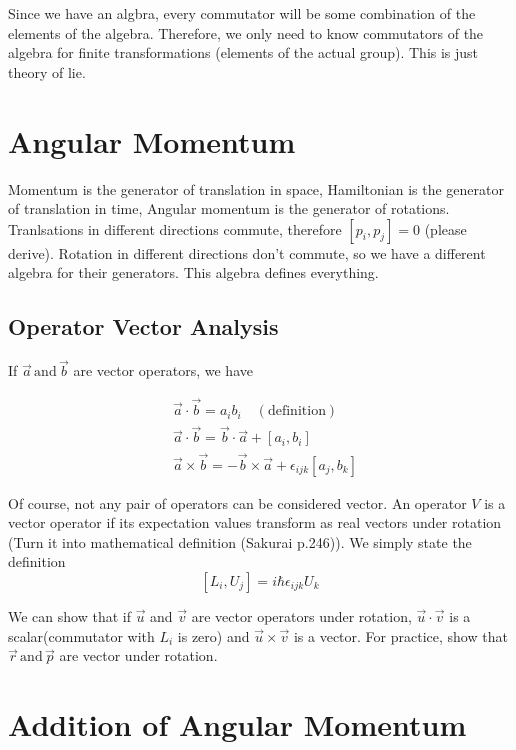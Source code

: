 \documentclass{report}
\begin{document}
\noindent Since we have an algbra, every commutator will be some combination of the elements of the algebra. Therefore, we only need to know commutators of the algebra for finite transformations (elements of the actual group). This is just theory of lie.

\section{Angular Momentum}

Momentum is the generator of translation in space, Hamiltonian is the generator of translation in time, Angular momentum is the generator of rotations.\\

\noindent Tranlsations in different directions commute, therefore $[p_i,p_j] = 0$ (please derive). Rotation in different directions don't commute, so we have a different algebra for their generators. This algebra defines everything.

\subsection{Operator Vector Analysis}

\noindent If $\vec{a} \, \mathrm{and} \, \vec{b}$ are vector operators,  we have

\begin{align}
&\vec{a}\cdot\vec{b} = a_ib_i \quad \mathrm{(definition)}\\
&\vec{a}\cdot\vec{b} = \vec{b}\cdot\vec{a} + [a_i,b_i]\\
&\vec{a}\times\vec{b} = -\vec{b}\times\vec{a} + \epsilon_{ijk}[a_j,b_k]
\end{align}

\noindent Of course, not any pair of operators can be considered vector. An operator $V$ is a vector operator if its expectation values transform as real vectors under rotation (Turn it into mathematical definition (Sakurai p.246)). We simply state the definition\\

$$[L_i, U_j]  = i\hbar\epsilon_{ijk}U_k$$

\noindent We can show that if $\vec{u}$ and $\vec{v}$ are vector operators under rotation, $\vec{u}\cdot\vec{v}$ is a scalar(commutator with $L_i$ is zero) and $\vec{u}\times\vec{v}$ is a vector. For practice, show that $\vec{r}\, \mathrm{and}\, \vec{p}$ are vector under rotation.

\section{Addition of Angular Momentum}
\end{document}
